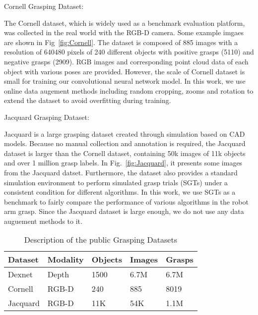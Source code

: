 \documentclass[journal]{IEEEtran}
\begin{document}
\begin{bfseries}
	Cornell Grasping Dataset:
\end{bfseries} 
The Cornell dataset, which is widely used as a benchmark evaluation platform, was collected in the real world with the RGB-D camera. Some example imgaes are shown in Fig~\ref{fig:Cornell}. The dataset is composed of 885 images with a resolution of 640480 pixels of 240 different objects with positive grasps (5110) and negative grasps (2909). RGB images and corresponding point cloud data of each object with various poses are provided. However, the scale of Cornell dataset is small for training our convolutional neural network model. In this work, we use online data augement methods including random cropping, zooms and rotation to extend the dataset to avoid overfitting during training.




\begin{bfseries}
	Jacquard Grasping Dataset: 
\end{bfseries}
Jacquard is a large grasping dataset created through simulation based on CAD models. Because no manual collection and annotation is required, the Jacquard dataset is larger than the Cornell dataset, containing 50k images of 11k objects and over 1 million grasp labels. In Fig.~\ref{fig:Jacquard}, it presents some images from the Jacquard datset. Furthermore, the dataset also provides a standard simulation environment to perform simulated grasp trials (SGTs) under a consistent condition for different algorithms. In this work, we use SGTs as a benchmark to fairly compare the performance of various algorithms in the robot arm grasp. Since the Jacquard dataset is large enough, we do not use any data auguement methods to it.




\begin{table}[htbp]
	\caption{Description of the public Grasping Datasets}	
	\begin{center}
		\begin{tabular}{p{30pt}|p{30pt}|p{30pt}|p{25pt}|p{25pt}}
			\hline
			\textbf{Dataset}&{\textbf{Modality}}&{\textbf{Objects}} &{\textbf{Images}} &{\textbf{Grasps}} \\
			\hline
			Dexnet& Depth & 1500 &  6.7M & 6.7M\\
			Cornell& RGB-D & 240 &  885 & 8019\\
			Jacquard& RGB-D & 11K &  54K & 1.1M\\


\hline
		\end{tabular}
	\end{center}
	\label{tab:datset}
\end{table}
\end{document}
